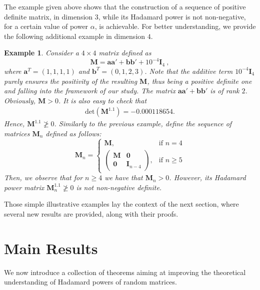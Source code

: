 \documentclass[conference,letterpaper]{IEEEtran}
\numberwithin{equation}{section}
\newcommand{\lbl}{\label}
\newcommand{\beaa}{\begin{eqnarray*}}
\newcommand{\eeaa}{\end{eqnarray*}}
\newtheorem{example}{{\sc Example}}[section]
\begin{document}
\medskip

The example given above shows that the construction of a sequence of positive definite matrix, in dimension $3$, while its Hadamard power is not non-negative, for a certain value of power $\alpha$, is achievable. 
For better understanding, we provide the following additional example in dimension $4$. 

\medskip

\begin{example}\lbl{good_example} 
Consider a $4\times 4$ matrix defined as 
$$\mathbf{M}=\mathbf{a}\mathbf{a}'+\mathbf{b}\mathbf{b}' + 10^{-4}\mathbf{I}_4 \ ,$$ 
where $\mathbf{a}^T=(1,1,1,1)$ and $\mathbf{b}^T=(0,1,2,3)$. 
Note that the additive term $10^{-4}\mathbf{I}_4$ purely ensures the positivity of the resulting $\mathbf{M}$, thus being a positive definite one and falling into the framework of our study.
The matrix $\mathbf{a}\mathbf{a}'+\mathbf{b}\mathbf{b}'$  is of rank $2$. Obviously, $\mathbf{M}>0$. 
It is also easy to check that
\beaa
\mbox{det}(\mathbf{M}^{1.1})=-0.000118654.
\eeaa
Hence, $\mathbf{M}^{1.1}\ngeqslant 0$.
Similarly to the previous example, define the sequence of matrices $\mathbf{M}_n$ defined as follows:
\[
    \mathbf{M}_n= 
\begin{cases}
    \mathbf{M},& \text{if } n=4\\
    \begin{pmatrix}
\mathbf{M} & \mathbf{0}\\
\mathbf{0} & \mathbf{I}_{n-4}
\end{pmatrix},              & \text{if } n\geq 5
\end{cases}
\]
Then, we observe that for $n\geq 4$ we have that $\mathbf{M}_n>0$. 
However, its Hadamard power matrix $\mathbf{M}_n^{1.1}\ngeqslant 0$ is not non-negative definite.
\end{example}
\medskip
Those simple illustrative examples lay the context of the next section, where several new results are provided, along with their proofs.


\section{Main Results}\lbl{sec:main}

We now introduce a collection of theorems aiming at improving the theoretical understanding of Hadamard powers of random matrices.
\end{document}
